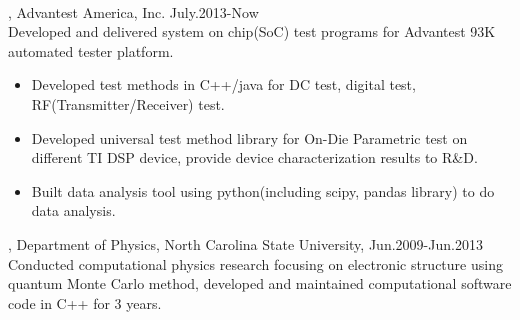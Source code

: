 \documentclass[11pt]{article} %
\begin{document}
\\
, Advantest America, Inc. July.2013-Now\\
\noindent Developed and delivered system on chip(SoC) test programs for Advantest 93K automated tester platform.\\ 
\begin{itemize}
  
    \item Developed test methods in C++/java for DC test, digital test, RF(Transmitter/Receiver) test.\\
 \vspace{-4mm}
    \item  Developed universal test method library for On-Die Parametric test on different TI DSP device, provide device characterization results to R\&D.\\ 
  \vspace{-4mm}
 \item  Built data analysis tool using python(including scipy, pandas library) to do data analysis.
  
 \end{itemize}
 \vspace{1mm}
, Department of Physics, North Carolina State University, Jun.2009-Jun.2013\\
\noindent Conducted computational physics research focusing on electronic structure using quantum Monte Carlo method, developed and maintained computational software code in C++ for 3 years.\\
\end{document}
